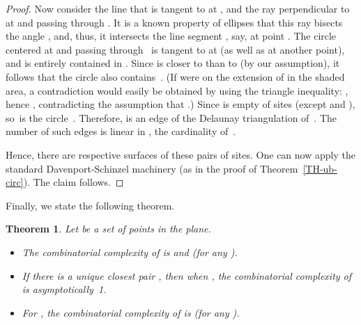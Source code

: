 \documentclass[10pt, conference, compsocconf]{IEEEtran}
\newtheorem{theorem}{Theorem}
\begin{document}
\begin{proof}
   Now consider the line  that is tangent to  at , and
   the ray  perpendicular to  at  and
   passing through .  It is a known property of ellipses that
   this ray bisects the angle , and, thus, it
   intersects the line segment , say, at point .
   The circle  centered at  and passing through~ is tangent to
    at  (as well as at another point), and is entirely
   contained in .  Since  is closer to  than to  (by our
   assumption), it follows that the circle  also contains~.  (If 
   were on the extension of  in the shaded area, a contradiction would
   easily be obtained by using the triangle inequality:  , hence
   , contradicting the assumption that
   .)  Since  is empty of sites (except  and ),
   so~is the circle~.
   Therefore,  is an edge of the Delaunay triangulation of~.
   The number of such edges is linear in , the cardinality of~.

   Hence, there are  respective surfaces of these pairs of sites.
   One can now apply the standard Davenport-Schinzel machinery (as in the
   proof of Theorem~\ref{TH-ub-circ}).  The claim follows.
\end{proof}

Finally, we state the following theorem.

\begin{theorem}
   \label{TH-param-per}
   Let  be a set of  points in the plane.
   \begin{itemize}
   \item[(a)]
      The combinatorial complexity of  is
       and  (for any ).
   \item[(b)]
      If there is a unique closest pair , then when
      , the combinatorial complexity of 
      is asymptotically~1.
   \item[(c)]
      For , the combinatorial complexity of 
      is  (for any ).
   \end{itemize}
\end{theorem}
\end{document}
